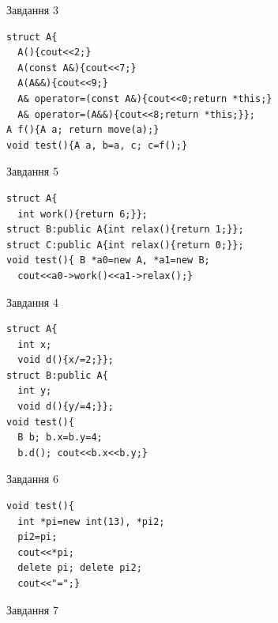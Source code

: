 \documentclass[12pt, ukrainian]{article}
\begin{document}
{{{{{{{{{{{{{{\begin{minipage}[t]{11cm}
               
{\begin{center}Завдання {3}\end{center}}
\vspace{-6mm}

\begin{verbatim}
struct A{
  A(){cout<<2;}
  A(const A&){cout<<7;}
  A(A&&){cout<<9;}
  A& operator=(const A&){cout<<0;return *this;}
  A& operator=(A&&){cout<<8;return *this;}};
A f(){A a; return move(a);}
void test(){A a, b=a, c; c=f();}
\end{verbatim}            


               
{\begin{center}Завдання {5}\end{center}}
\vspace{-6mm}

\begin{verbatim}
struct A{
  int work(){return 6;}}; 
struct B:public A{int relax(){return 1;}};
struct C:public A{int relax(){return 0;}};
void test(){ B *a0=new A, *a1=new B;
  cout<<a0->work()<<a1->relax();}
\end{verbatim}            


\end{minipage}
\vline \hspace{8mm}
\begin{minipage}[t]{7cm}
               
{\begin{center}Завдання {4}\end{center}}
\vspace{-6mm}

\begin{verbatim}
struct A{
  int x;
  void d(){x/=2;}};
struct B:public A{
  int y;
  void d(){y/=4;}};
void test(){
  B b; b.x=b.y=4;
  b.d(); cout<<b.x<<b.y;}
\end{verbatim}            


               
{\begin{center}Завдання {6}\end{center}}
\vspace{-6mm}

\begin{verbatim}
void test(){
  int *pi=new int(13), *pi2;
  pi2=pi;
  cout<<*pi;
  delete pi; delete pi2;
  cout<<"=";}
\end{verbatim}            


               
{\begin{center}Завдання {7}\end{center}}
\vspace{-6mm}


\end{minipage}}}}}}}}}}}}}}}
\end{document}
